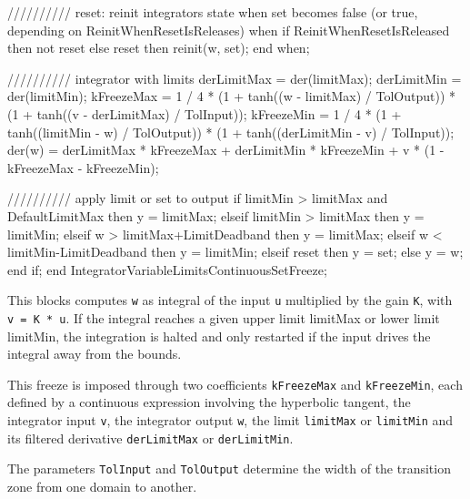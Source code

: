 \documentclass[
  a4paper,
  DIV=11,
  numbers=noendperiod]{scrartcl}
\newenvironment{Shaded}{\begin{snugshade}}{\end{snugshade}}
\newcommand{\NormalTok}[1]{\textcolor[rgb]{0.00,0.23,0.31}{#1}}
\begin{document}
\begin{Shaded}
\begin{Highlighting}[]
\NormalTok{    ////////// reset: reinit integrator\textquotesingle{}s state when set becomes false (or true, depending on ReinitWhenResetIsReleases)}
\NormalTok{    when if ReinitWhenResetIsReleased then not reset else reset then}
\NormalTok{      reinit(w, set);}
\NormalTok{    end when;}
    
\NormalTok{    ////////// integrator with limits}
\NormalTok{    derLimitMax = der(limitMax);}
\NormalTok{    derLimitMin = der(limitMin);}
\NormalTok{    kFreezeMax = 1 / 4 * (1 + tanh((w {-} limitMax) / TolOutput)) * (1 + tanh((v {-} derLimitMax) / TolInput));}
\NormalTok{    kFreezeMin = 1 / 4 * (1 + tanh((limitMin {-} w) / TolOutput)) * (1 + tanh((derLimitMin {-} v) / TolInput));}
\NormalTok{    der(w) = derLimitMax * kFreezeMax + derLimitMin * kFreezeMin + v * (1 {-} kFreezeMax {-} kFreezeMin);}
    
\NormalTok{    ////////// apply limit or set to output}
\NormalTok{    if limitMin \textgreater{} limitMax and DefaultLimitMax then}
\NormalTok{        y = limitMax;}
\NormalTok{    elseif limitMin \textgreater{} limitMax then}
\NormalTok{        y = limitMin;}
\NormalTok{    elseif w \textgreater{} limitMax+LimitDeadband then}
\NormalTok{        y = limitMax;}
\NormalTok{    elseif w \textless{} limitMin{-}LimitDeadband then}
\NormalTok{        y = limitMin;}
\NormalTok{    elseif reset then}
\NormalTok{        y = set;}
\NormalTok{    else}
\NormalTok{        y = w;}
\NormalTok{    end if;}
\NormalTok{end IntegratorVariableLimitsContinuousSetFreeze;}
\end{Highlighting}
\end{Shaded}

This blocks computes \texttt{w} as integral of the input \texttt{u}
multiplied by the gain \texttt{K}, with \texttt{v\ =\ K\ *\ u}. If the
integral reaches a given upper limit limitMax or lower limit limitMin,
the integration is halted and only restarted if the input drives the
integral away from the bounds.

This freeze is imposed through two coefficients \texttt{kFreezeMax} and
\texttt{kFreezeMin}, each defined by a continuous expression involving
the hyperbolic tangent, the integrator input \texttt{v}, the integrator
output \texttt{w}, the limit \texttt{limitMax} or \texttt{limitMin} and
its filtered derivative \texttt{derLimitMax} or \texttt{derLimitMin}.

The parameters \texttt{TolInput} and \texttt{TolOutput} determine the
width of the transition zone from one domain to another.
\end{document}
